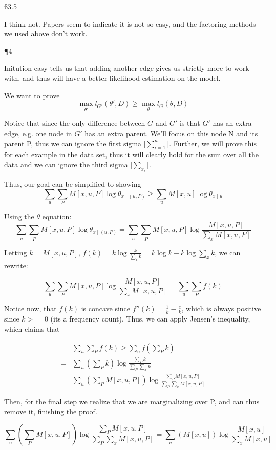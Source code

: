 \ss{3.5}

I think not. Papers seem to indicate it is not so easy, and the factoring methods we used above don't work.


\P 4

Initution easy tells us that adding another edge gives us strictly more to work with, and thus will have a better likelihood estimation on the model.

We want to prove 
\[
\max_{\theta'} l_{G'} (\theta', D) \ge \max_{\theta} l_{G} (\theta, D)
\]

Notice that since the only difference between $G$ and $G'$ is that $G'$ has an extra edge, e.g. one node in $G'$ has an extra parent. We'll focus on this node N and its parent P, thus we can ignore the first sigma [$\sum_{i=1}^n$]. Further, we will prove this for each example in the data set, thus it will clearly hold for the sum over all the data and we can ignore the third sigma [$\sum_{x_i}$].

Thus, our goal can be simplified to showing
\[
\sum_{u} \sum_{P} M[x,u,P] \log \theta_{x \mid (u,P)} \ge \sum_{u} M[x,u] \log \theta_{x \mid u} 
\]

Using the $\theta$ equation:
\[
\sum_{u} \sum_{P} M[x,u,P] \log \theta_{x \mid (u,P)} = \sum_{u} \sum_{P} M[x,u,P] \log \frac{M[x,u,P]}{\sum_x M[x,u,P]}
\]

Letting $k = M[x,u,P]$, $f(k) = k \log \frac{k}{\sum_x k} = k \log k - k \log{\sum_x k} $, we can rewrite:

\[
\sum_{u} \sum_{P} M[x,u,P] \log \frac{M[x,u,P]}{\sum_x M[x,u,P]} = \sum_{u} \sum_{P} f(k)
\]

Notice now, that $f(k)$ is concave since $f''(k) = \frac{1}{k}-\frac{c}{k}$, which is always positive since $k >=0$ (its a frequency count). Thus, we can apply Jensen's inequality, which claims that 

\begin{align*}
& \sum_{u} \sum_{P} f(k) \ge \sum_{u} f(\sum_{P} k) \\ =   & \sum_{u} (\sum_{P} k) \log \frac{\sum_{P} k}{\sum_{P} \sum_x k} \\
=   & \sum_{u} (\sum_{P} M[x,u,P]) \log \frac{\sum_{P} M[x,u,P]}{\sum_{P} \sum_x M[x,u,P]}
\end{align*}

Then, for the final step we realize that we are marginalizing over P, and can thus remove it, finishing the proof.

\[
\sum_{u} (\sum_{P} M[x,u,P]) \log \frac{\sum_{P} M[x,u,P]}{\sum_{P} \sum_x M[x,u,P]} = \sum_{u} ( M[x,u]) \log \frac{M[x,u]}{\sum_x M[x,u]}
\]

